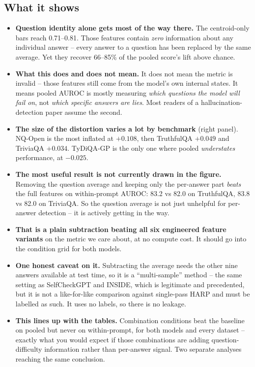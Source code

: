 \documentclass[11pt,a4paper]{article}
\begin{document}
\subsection*{What it shows}
\begin{itemize}
\item \textbf{Question identity alone gets most of the way there.} The centroid-only bars reach
0.71--0.81. Those features contain \emph{zero} information about any individual answer -- every
answer to a question has been replaced by the same average. Yet they recover 66--85\% of the
pooled score's lift above chance.

\item \textbf{What this does and does not mean.} It does not mean the metric is invalid -- those
features still come from the model's own internal states. It means pooled AUROC is mostly
measuring \emph{which questions the model will fail on}, not \emph{which specific answers are
lies}. Most readers of a hallucination-detection paper assume the second.

\item \textbf{The size of the distortion varies a lot by benchmark} (right panel). NQ-Open is the
most inflated at $+0.108$, then TruthfulQA $+0.049$ and TriviaQA $+0.034$. TyDiQA-GP is the only
one where pooled \emph{understates} performance, at $-0.025$.

\item \textbf{The most useful result is not currently drawn in the figure.} Removing the question
average and keeping only the per-answer part \emph{beats} the full features on within-prompt
AUROC: 83.2 vs 82.0 on TruthfulQA, 83.8 vs 82.0 on TriviaQA. So the question average is not just
unhelpful for per-answer detection -- it is actively getting in the way.

\item \textbf{That is a plain subtraction beating all six engineered feature variants} on the
metric we care about, at no compute cost. It should go into the condition grid for both models.

\item \textbf{One honest caveat on it.} Subtracting the average needs the other nine answers
available at test time, so it is a ``multi-sample'' method -- the same setting as SelfCheckGPT and
INSIDE, which is legitimate and precedented, but it is not a like-for-like comparison against
single-pass HARP and must be labelled as such. It uses no labels, so there is no leakage.

\item \textbf{This lines up with the tables.} Combination conditions beat the baseline on pooled
but never on within-prompt, for both models and every dataset -- exactly what you would expect if
those combinations are adding question-difficulty information rather than per-answer signal. Two
separate analyses reaching the same conclusion.
\end{itemize}
\end{document}
